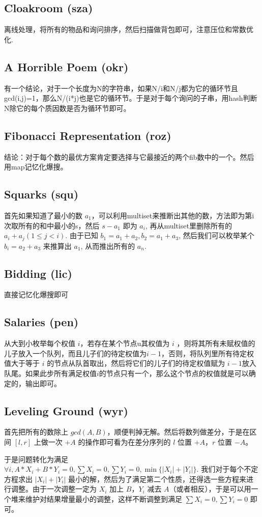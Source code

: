 \documentclass[a4paper,11pt]{article}
\begin{document}
\subsection*{Cloakroom (sza)}
离线处理，将所有的物品和询问排序，然后扫描做背包即可，注意压位和常数优化.
\subsection*{A Horrible Poem (okr)}
有一个结论，对于一个长度为N的字符串，如果N/i和N/j都为它的循环节且gcd(i,j)=1，那么N/(i*j)也是它的循环节。于是对于每个询问的子串，用hash判断N除它的每个质因数是否为循环节即可。
\subsection*{Fibonacci Representation (roz)}
结论：对于每个数的最优方案肯定要选择与它最接近的两个fib数中的一个。然后用map记忆化爆搜。
\subsection*{Squarks (squ)}
首先如果知道了最小的数 $a_1$，可以利用multiset来推断出其他的数，方法即为第i次取所有的和中最小的s，然后 $s-a_1$ 即为 $a_i$, 再从multiset里删除所有的 $a_i + a_j (1 \le j < i)$. 由于已知 $b_1 = a_1 + a_2, b_2 = a_1 + a_3$, 然后我们可以枚举某个 $b_i = a_2 + a_3$ 来推算出 $a_1$, 从而推出所有的 $a_n$.
\subsection*{Bidding (lic)}
直接记忆化爆搜即可
\subsection*{Salaries (pen)}
从大到小枚举每个权值 $i$，若存在某个节点u其权值为 $i$ ，则将其所有未赋权值的儿子放入一个队列，而且儿子们的待定权值为$i-1$，否则，将队列里所有待定权值大于等于 $i$ 的节点从队首取出，然后将它们的儿子们的待定权值赋为 $i - 1$放入队尾。如果此步所有满足权值$i$的节点只有一个，那么这个节点的权值就是可以确定的，输出即可。
\subsection*{Leveling Ground (wyr)}
首先把所有的数除上 $gcd(A,B)$，顺便判掉无解。然后将数列做差分，于是在区间 $[l,r]$ 上做一次 $+A$ 的操作即可看为在差分序列的 $l$ 位置 $+A$，$r$ 位置 $-A$。

于是问题转化为满足 $\displaystyle\forall i, A * X_i + B * Y_i = 0, \sum X_i = 0, \sum Y_i = 0, \min\{|X_i| + |Y_i|\}$. 我们对于每个不定方程求出 $|X_i| + |Y_i|$ 最小的解，然后为了满足第二个性质，还得选一些方程来进行调整。由于一次调整一定为 $X_i$ 加上 $B$，$Y_i$ 减去 $A$（或者相反），于是可以用一个堆来维护对结果增量最小的调整，这样不断调整到满足 $\sum X_i = 0, \sum Y_i = 0$ 即可。
\end{document}
